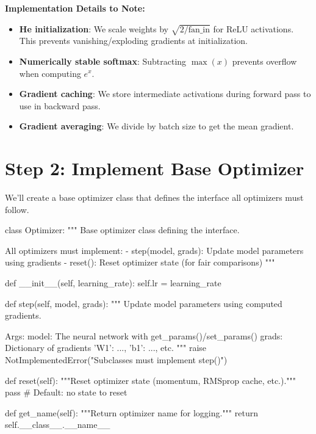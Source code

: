 \documentclass[../../main.tex]{subfiles}
\begin{document}
\begin{keyconcept}
\textbf{Implementation Details to Note:}
\begin{itemize}
    \item \textbf{He initialization}: We scale weights by $\sqrt{2/\text{fan\_in}}$ for ReLU activations. This prevents vanishing/exploding gradients at initialization.
    \item \textbf{Numerically stable softmax}: Subtracting $\max(x)$ prevents overflow when computing $e^x$.
    \item \textbf{Gradient caching}: We store intermediate activations during forward pass to use in backward pass.
    \item \textbf{Gradient averaging}: We divide by batch size to get the mean gradient.
\end{itemize}
\end{keyconcept}

\section{Step 2: Implement Base Optimizer}
\label{sec:capstone-base-optimizer}

We'll create a base optimizer class that defines the interface all optimizers must follow.

\begin{pythoncode}
class Optimizer:
    """
    Base optimizer class defining the interface.

    All optimizers must implement:
    - step(model, grads): Update model parameters using gradients
    - reset(): Reset optimizer state (for fair comparisons)
    """

    def __init__(self, learning_rate):
        self.lr = learning_rate

    def step(self, model, grads):
        """
        Update model parameters using computed gradients.

        Args:
            model: The neural network with get_params()/set_params()
            grads: Dictionary of gradients {'W1': ..., 'b1': ..., etc.}
        """
        raise NotImplementedError("Subclasses must implement step()")

    def reset(self):
        """Reset optimizer state (momentum, RMSprop cache, etc.)."""
        pass  # Default: no state to reset

    def get_name(self):
        """Return optimizer name for logging."""
        return self.__class__.__name__
\end{pythoncode}
\end{document}
